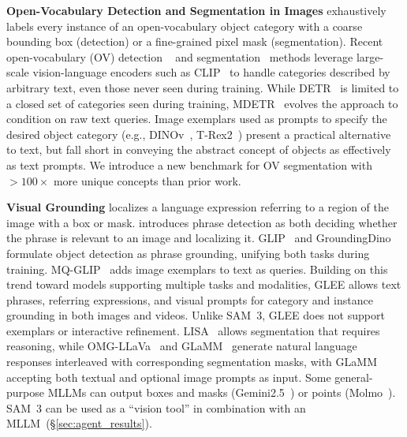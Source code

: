 \documentclass[]{fairmeta}
\newcommand{\eg}{e.g., }
\newcommand{\model}{SAM~3\xspace}
\begin{document}
\textbf{Open-Vocabulary Detection and Segmentation in Images}  exhaustively labels every instance of an open-vocabulary object category with a coarse bounding box (detection) or a fine-grained pixel mask (segmentation). 
Recent open-vocabulary (OV) detection  ~\citep{gu2021open,minderer2022simple} and segmentation~\citep{ding2022open, liang2023open} methods leverage large-scale vision-language encoders such as CLIP~\citep{radford2021learning} to handle categories described by arbitrary text, even those never seen during training. 
While DETR~\citep{carion2020end} is limited to a closed set of categories seen during training, MDETR~\citep{kamath2021mdetr} evolves the approach to condition on raw text queries. %
Image exemplars used as prompts to specify the desired object category (\eg DINOv~\citep{Li2023VisualIP}, T-Rex2~\citep{trex2}) present a practical alternative to text, but fall short in conveying the abstract concept of objects as effectively as text prompts. We introduce a new benchmark for OV segmentation with $>100\times$ more unique concepts than prior work.%


\textbf{Visual Grounding}
localizes a language expression referring to a region of the image with a box or mask. \citep{plummer2020revisiting} introduces phrase detection as both deciding whether the phrase is relevant to an image and localizing it. GLIP~\citep{li2022grounded} and GroundingDino~\citep{Liu2023GroundingDM} formulate object detection as phrase grounding, unifying both tasks during training. MQ-GLIP~\citep{xu2023multi} adds image exemplars to text as queries.
Building on this trend toward models supporting multiple tasks and modalities, GLEE \citep{glee} allows text phrases, referring expressions, and visual prompts for category and instance grounding in both images and videos.
Unlike \model, GLEE does not support exemplars or interactive refinement. 
LISA~\citep{lai2024lisa} allows segmentation that requires reasoning, while OMG-LLaVa~\citep{zhang2024omg} and GLaMM~\citep{rasheed2024glamm}  generate natural language responses interleaved with corresponding segmentation masks, with GLaMM accepting both textual and optional image prompts as input.
Some general-purpose MLLMs can output boxes and masks (Gemini2.5~\citep{comanici2025gemini}) or points (Molmo~\citep{molmo}). \model 
can be used as a ``vision tool'' in combination with an MLLM~(\S\ref{sec:agent_results}). 
\end{document}
